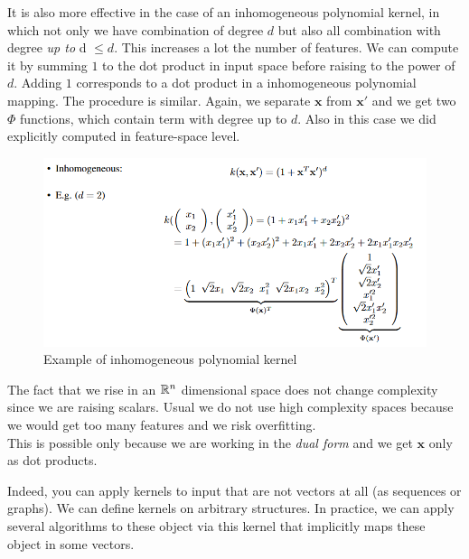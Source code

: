     It is also more effective in the case of an inhomogeneous polynomial kernel, in which not only we have combination of degree $d$ but also all combination with degree\textit{ up to} d $\leq d$. This increases a lot the number of features. 
    We can compute it by summing $1$ to the dot product in input space before raising to the power of $d$. Adding $1$ corresponds to a dot product in a inhomogeneous polynomial mapping. The procedure is similar.
    Again, we separate $\pmb{x}$ from $\pmb{x}'$ and we get two $\Phi$ functions, which contain term with degree up to $d$. Also in this case we did explicitly computed in feature-space level.
    \begin{figure}[ht]
        \centering
        \includegraphics[scale=0.5]{images/inho_kernel.png}
        \caption{Example of inhomogeneous polynomial kernel}
        \label{fig:inhomo_poly_kernel}
    \end{figure}

    The fact that we rise in an $\mathbb{R} ^n$ dimensional space does not change complexity since we are raising scalars. Usual we do not use high complexity spaces because we would get too many features and we risk overfitting.\\

    This is possible only because we are working in the \textit{dual form} and we get $\pmb{x}$ only as dot products.

    Indeed, you can apply kernels to input that are not vectors at all (as sequences or graphs). We can define kernels on arbitrary structures. 
    In practice, we can apply several algorithms to these object via this kernel that implicitly maps these object in some vectors.

